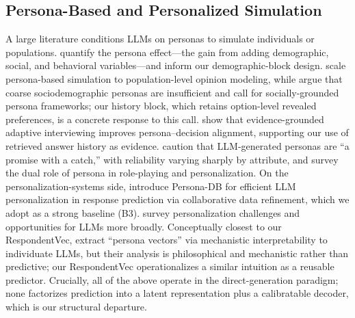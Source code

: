 \subsection{Persona-Based and Personalized Simulation}
A large literature conditions LLMs on personas to simulate individuals or populations. \citet{hu2024quantifying} quantify the persona effect---the gain from adding demographic, social, and behavioral variables---and inform our demographic-block design. \citet{li2026personabased} scale persona-based simulation to population-level opinion modeling, while \citet{venkit2026need} argue that coarse sociodemographic personas are insufficient and call for socially-grounded persona frameworks; our history block, which retains option-level revealed preferences, is a concrete response to this call. \citet{su2026adaptive} show that evidence-grounded adaptive interviewing improves persona--decision alignment, supporting our use of retrieved answer history as evidence. \citet{li2025generated} caution that LLM-generated personas are ``a promise with a catch,'' with reliability varying sharply by attribute, and \citet{tseng2024tales} survey the dual role of persona in role-playing and personalization. On the personalization-systems side, \citet{sun2024personadb} introduce Persona-DB for efficient LLM personalization in response prediction via collaborative data refinement, which we adopt as a strong baseline (B3). \citet{chen2024when} survey personalization challenges and opportunities for LLMs more broadly. Conceptually closest to our RespondentVec, \citet{beckmann2026where} extract ``persona vectors'' via mechanistic interpretability to individuate LLMs, but their analysis is philosophical and mechanistic rather than predictive; our RespondentVec operationalizes a similar intuition as a reusable predictor. Crucially, all of the above operate in the direct-generation paradigm; none factorizes prediction into a latent representation plus a calibratable decoder, which is our structural departure.

